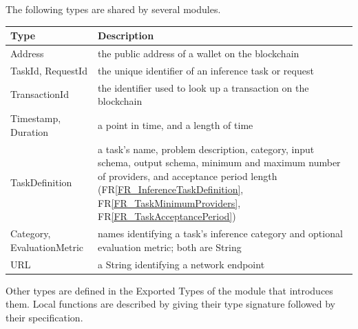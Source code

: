 \documentclass[12pt, titlepage]{article}
\newcommand{\rref}[1]{FR\ref{#1}}
\begin{document}
\noindent
The following types are shared by several modules.

\begin{center}
\renewcommand{\arraystretch}{1.2}
\noindent
\begin{tabular}{l p{10.5cm}}
\toprule
\textbf{Type} & \textbf{Description}\\
\midrule
Address & the public address of a wallet on the blockchain\\
TaskId, RequestId & the unique identifier of an inference task or request\\
TransactionId & the identifier used to look up a transaction on the
  blockchain\\
Timestamp, Duration & a point in time, and a length of time\\
TaskDefinition & a task's name, problem description, category, input schema,
  output schema, minimum and maximum number of providers, and acceptance
  period length (\rref{FR_InferenceTaskDefinition},
  \rref{FR_TaskMinimumProviders}, \rref{FR_TaskAcceptancePeriod})\\
Category, EvaluationMetric & names identifying a task's inference category
  and optional evaluation metric; both are String\\
URL & a String identifying a network endpoint\\
\bottomrule
\end{tabular}
\end{center}

\noindent
Other types are defined in the Exported Types of the module that introduces
them. Local functions are described by giving their type signature followed by
their specification.
\end{document}
